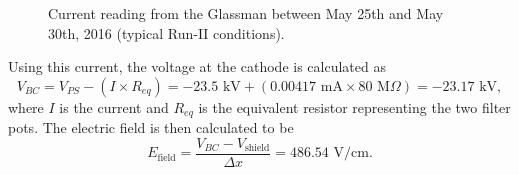 \begin{figure}[h]
\begin{minipage}{0.45\textwidth}
\caption{Current reading from the Glassman between May 25th and May 30th, 2016 (typical Run-II conditions).}
\label{fig:currentMeasurement}
\end{minipage}
\end{figure}

Using this current, the voltage at the cathode is calculated as
\begin{equation} \label{eq:VBC}
V_{BC}=V_{PS} - (I \times R_{eq}) = -23.5\text{ kV} + ( 0.00417\text{ mA} \times 80\text{ M}\Omega ) = -23.17\text{ kV}, 
\end{equation}
where $I$ is the current and $R_{eq}$ is the equivalent resistor representing the two filter pots. The electric field is then calculated to be
\begin{equation}E_{\text{field}} = \frac{V_{BC} - V_{\text{shield}}}{\Delta x} = 486.54\text{ V/cm}.
\end{equation}



